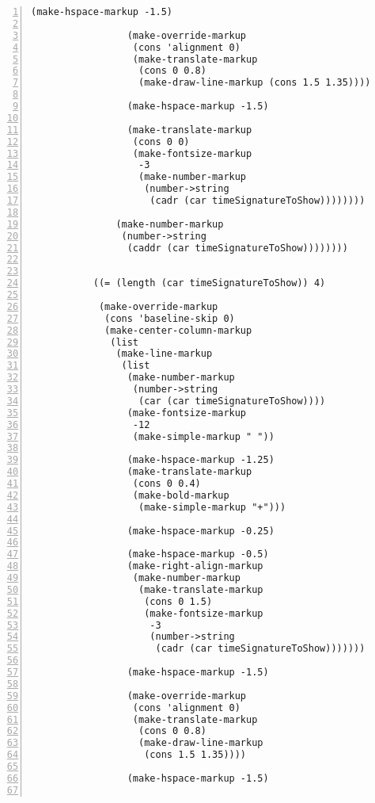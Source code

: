 \begin{Verbatim}[numbers=left,xleftmargin=5mm]
                 (make-hspace-markup -1.5)

                 (make-override-markup
                  (cons 'alignment 0)
                  (make-translate-markup
                   (cons 0 0.8)
                   (make-draw-line-markup (cons 1.5 1.35))))

                 (make-hspace-markup -1.5)

                 (make-translate-markup
                  (cons 0 0)
                  (make-fontsize-markup
                   -3
                   (make-number-markup
                    (number->string
                     (cadr (car timeSignatureToShow))))))))

               (make-number-markup
                (number->string
                 (caddr (car timeSignatureToShow))))))))


           ((= (length (car timeSignatureToShow)) 4)

            (make-override-markup
             (cons 'baseline-skip 0)
             (make-center-column-markup
              (list
               (make-line-markup
                (list
                 (make-number-markup
                  (number->string
                   (car (car timeSignatureToShow))))
                 (make-fontsize-markup
                  -12
                  (make-simple-markup " "))

                 (make-hspace-markup -1.25)
                 (make-translate-markup
                  (cons 0 0.4)
                  (make-bold-markup
                   (make-simple-markup "+")))

                 (make-hspace-markup -0.25)

                 (make-hspace-markup -0.5)
                 (make-right-align-markup
                  (make-number-markup
                   (make-translate-markup
                    (cons 0 1.5)
                    (make-fontsize-markup
                     -3
                     (number->string
                      (cadr (car timeSignatureToShow)))))))

                 (make-hspace-markup -1.5)

                 (make-override-markup
                  (cons 'alignment 0)
                  (make-translate-markup
                   (cons 0 0.8)
                   (make-draw-line-markup
                    (cons 1.5 1.35))))

                 (make-hspace-markup -1.5)


\end{Verbatim}
